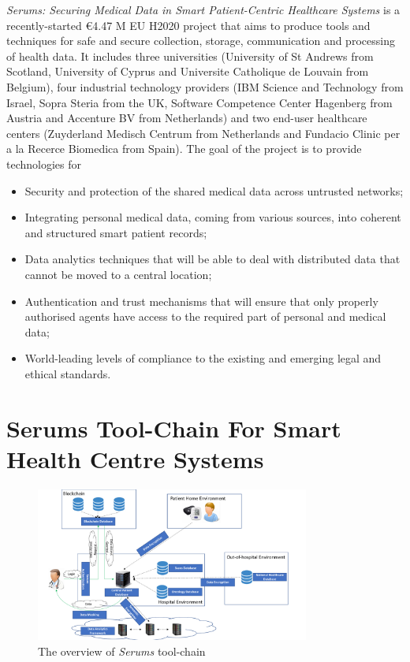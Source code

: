 \noindent
\emph{Serums: Securing Medical Data in Smart Patient-Centric Healthcare Systems} is a recently-started €4.47 M EU H2020 project that aims to produce tools and techniques for safe and secure collection, storage, communication and processing of health data. It includes three universities (University of St Andrews from Scotland, University of Cyprus and Universite Catholique de Louvain from Belgium), four industrial technology providers (IBM Science and Technology from Israel, Sopra Steria from the UK, Software Competence Center Hagenberg from Austria and Accenture BV from Netherlands) and two end-user healthcare centers (Zuyderland Medisch Centrum from Netherlands and Fundacio Clinic per a la Recerce Biomedica from Spain). The goal of the project is to provide technologies for
\begin{itemize}
    \item Security and protection of the shared medical data across untrusted networks;
    \item Integrating personal medical data, coming from various sources, into coherent and structured smart patient records;
    \item Data analytics techniques that will be able to deal with distributed data that cannot be moved to a central location;
    \item Authentication and trust mechanisms that will ensure that only properly authorised agents have access to the required part of personal and medical data;
    \item World-leading levels of compliance to the existing and emerging legal and ethical standards.
\end{itemize}

\section{Serums Tool-Chain For Smart Health Centre Systems}

\begin{figure}[ht!]
    \centering
    \includegraphics[width=90mm]{images/SerumsOverview.pdf}
    \caption{The overview of \emph{Serums} tool-chain}
    \label{fig:serumsTools}
\end{figure}

